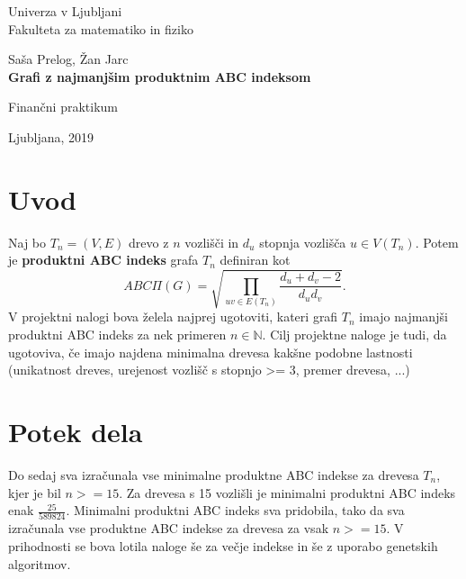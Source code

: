 \documentclass[a4paper,12 pt]{article}
\begin{document}
\begin{titlepage}
\begin{center}

\large
Univerza v Ljubljani\\
\normalsize
Fakulteta za matematiko in fiziko\\

\vspace{3 cm} 

\large
Saša Prelog, Žan Jarc\\

\vspace{0.5cm}
\LARGE
\textbf{Grafi z najmanjšim  produktnim ABC indeksom}

\vspace{0.5 cm}
\normalsize
Finančni praktikum



\vspace{3cm}


\vfill

\large Ljubljana, 2019

\end{center}
\end{titlepage}

\newpage

\tableofcontents
\vspace{20mm}

\newpage

\section[Uvod]{Uvod}
Naj bo $T_n = (V, E)$ drevo z $n$ vozlišči in $d_u$ stopnja vozlišča $u \in V(T_n)$. Potem je \textbf{produktni ABC indeks} grafa $T_n$ definiran kot
$$
ABC \Pi (G) = \sqrt{ {\displaystyle \prod_{uv \in E(T_n)}} \frac{d_u + d_v - 2}{d_u d_v}}.
$$
V projektni nalogi bova želela najprej ugotoviti, kateri grafi $T_n$ imajo najmanjši produktni ABC indeks za nek primeren $n \in \mathbb{N}$. Cilj projektne naloge je tudi, da ugotoviva, če imajo najdena minimalna drevesa kakšne podobne lastnosti (unikatnost dreves, urejenost vozlišč s stopnjo >= 3, premer drevesa, ...)

\section[Potek dela]{Potek dela}
Do sedaj sva izračunala vse minimalne produktne ABC indekse za drevesa $T_n$, kjer je bil $n>=15$. Za drevesa s 15 vozlišli je minimalni produktni ABC indeks enak $\frac{25}{589824}$.
Minimalni produktni ABC indeks sva pridobila, tako da sva izračunala vse produktne ABC indekse za drevesa za vsak $n>=15$. V prihodnosti se bova lotila naloge še za večje indekse in še z uporabo genetskih algoritmov.
\end{document}
